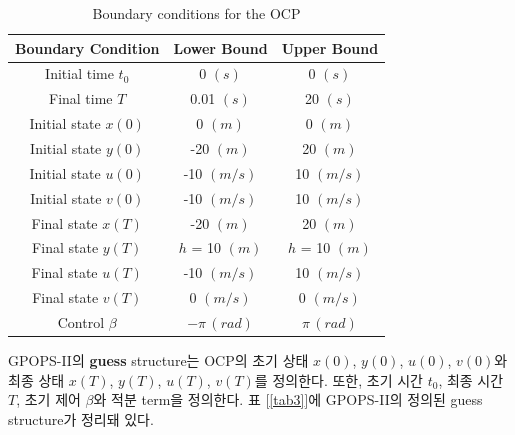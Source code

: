 \begin{table}[H]
	\begin{tabular}{|c|c|c|}
		\hline
		\textbf{Boundary Condition} & \textbf{Lower Bound} & \textbf{Upper Bound} \\
		\hline
		Initial time $t_0$          & 0 $(s)$              & 0 $(s)$              \\
		\hline
		Final time $T$              & 0.01 $(s)$           & 20 $(s)$             \\
		\hline
		Initial state $x(0)$        & 0 $(m)$              & 0 $(m)$              \\
		Initial state $y(0)$        & -20 $(m)$            & 20 $(m)$             \\
		Initial state $u(0)$        & -10 $(m/s)$          & 10 $(m/s)$           \\
		Initial state $v(0)$        & -10 $(m/s)$          & 10 $(m/s)$           \\
		\hline
		Final state $x(T)$          & -20 $(m)$            & 20 $(m)$             \\
		Final state $y(T)$          & $h$ = 10 $(m)$       & $h$ = 10 $(m)$       \\
		Final state $u(T)$          & -10 $(m/s)$          & 10 $(m/s)$           \\
		Final state $v(T)$          & 0 $(m/s)$            & 0 $(m/s)$            \\
		\hline
		Control $\beta$             & $-\pi\,(rad)$        & $\pi\,(rad)$         \\
		\hline
	\end{tabular}
	\centering
	\caption{Boundary conditions for the OCP}
	\label{tab2}
\end{table}

GPOPS-II의 \textbf{guess} structure는 OCP의 초기 상태 $x(0)$, $y(0)$, $u(0)$, $v(0)$와 최종 상태 $x(T)$, $y(T)$, $u(T)$, $v(T)$를 정의한다.
또한, 초기 시간 $t_0$, 최종 시간 $T$, 초기 제어 $\beta$와 적분 term을 정의한다.
표 [\ref{tab3}]에 GPOPS-II의 정의된 guess structure가 정리돼 있다.

